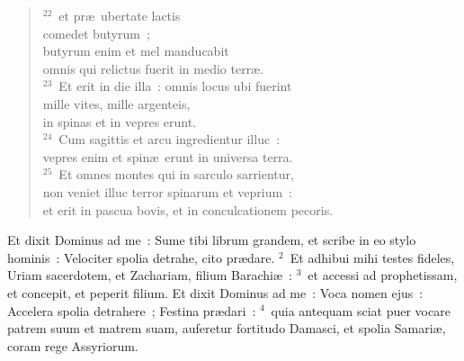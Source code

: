 \begin{flushleft}
\begin{verse}
${}^{22}$~et pr\ae\ ubertate lactis\\ comedet butyrum~;\\ butyrum enim et mel manducabit\\ omnis qui relictus fuerit in medio terr\ae .\\
${}^{23}$~Et erit in die illa~: omnis locus ubi fuerint\\ mille vites, mille argenteis,\\ in spinas et in vepres erunt.\\
${}^{24}$~Cum sagittis et arcu ingredientur illuc~:\\ vepres enim et spin\ae\ erunt in universa terra.\\
${}^{25}$~Et omnes montes qui in sarculo sarrientur,\\ non veniet illuc terror spinarum et veprium~:\\ et erit in pascua bovis, et in conculcationem pecoris.\end{verse}\end{flushleft}



\lettrine[lines=3,image=true,loversize=0.05,lraise=-0.03]{E}{}t dixit Dominus ad me~: Sume tibi librum grandem, et scribe in eo stylo hominis~: Velociter spolia detrahe, cito pr\ae dare.
${}^{2}$~Et adhibui mihi testes fideles, Uriam sacerdotem, et Zachariam, filium Barachi\ae~:
${}^{3}$~et accessi ad prophetissam, et concepit, et peperit filium. Et dixit Dominus ad me~: Voca nomen ejus~: Accelera spolia detrahere~; Festina pr\ae dari~:
${}^{4}$~quia antequam sciat puer vocare patrem suum et matrem suam, auferetur fortitudo Damasci, et spolia Samari\ae , coram rege Assyriorum.


